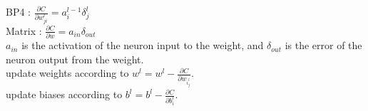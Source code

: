 \documentclass[12pt,a4paper]{article}
\begin{document}
BP4 : $\frac{\partial C}{\partial w_{ji}^l} = a_i^{l-1} \delta _j^l$ \\
Matrix : $\frac{\partial C}{\partial w} = a_{in} \delta _{out}$ \\
$a_{in}$ is the activation of the neuron input to the weight, and $\delta _{out}$ is the error of the neuron output from the weight. \\


update weights according to $w^l = w^l - \frac{\partial C}{\partial w_i_j^l}$. \\
update biases according to $b^l = b^l - \frac{\partial C}{\partial b_i^l}$. \\
\end{document}

